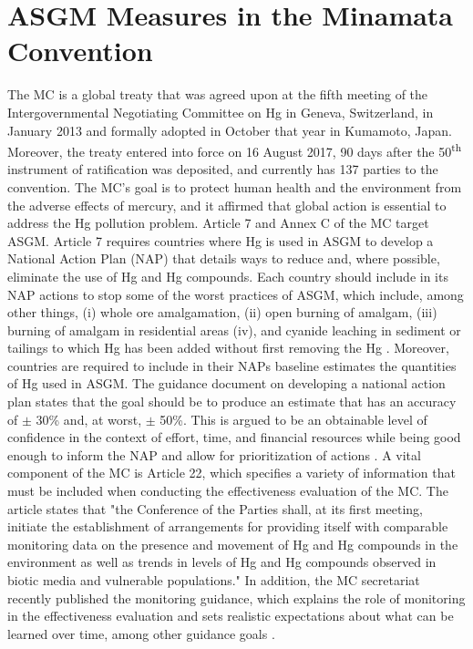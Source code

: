 \section{ASGM Measures in the Minamata Convention}
\begin{flushleft}
    

The MC is a global treaty that was agreed upon at the fifth meeting of the Intergovernmental Negotiating Committee on Hg in Geneva, Switzerland, in January 2013 and formally adopted in October that year in Kumamoto, Japan. Moreover, the treaty entered into force on 16 August 2017, 90 days after the 50\textsuperscript{th} instrument of ratification was deposited, and currently has 137 parties to the convention\cite{unep_minamata_2013}. The MC's goal is to protect human health and the environment from the adverse effects of mercury, and it affirmed that global action is essential to address the Hg pollution problem. Article 7 and Annex C of the MC target ASGM. Article 7 requires countries where Hg is used in ASGM to develop a National Action Plan (NAP) that details ways to reduce and, where possible, eliminate the use of Hg and Hg compounds. Each country should include in its NAP actions to stop some of the worst practices of ASGM, which include, among other things, (i) whole ore amalgamation, (ii) open burning of amalgam, (iii) burning of amalgam in residential areas (iv), and cyanide leaching in sediment or tailings to which Hg has been added without first removing the Hg \cite{united_nations_environment_programme_technical_2019}.
Moreover, countries are required to include in their NAPs baseline estimates the quantities of Hg used in ASGM. The guidance document on developing a national action plan states that the goal should be to produce an estimate that has an accuracy of $\pm$ 30\% and, at worst, $\pm$ 50\%.  This is argued to be an obtainable level of confidence in the context of effort, time, and financial resources while being good enough to inform the NAP and allow for prioritization of actions \cite{unep_developing_2017}. A vital component of the MC is Article 22, which specifies a variety of information that must be included when conducting the effectiveness evaluation of the MC. The article states that "the Conference of the Parties shall, at its first meeting, initiate the establishment of arrangements for providing itself with comparable monitoring data on the presence and movement of Hg and Hg compounds in the environment as well as trends in levels of Hg and Hg compounds observed in biotic media and vulnerable populations." In addition, the MC secretariat recently published the monitoring guidance, which explains the role of monitoring in the effectiveness evaluation and sets realistic expectations about what can be learned over time, among other guidance goals \cite{unep_guidance_2021}. 
\end{flushleft}

